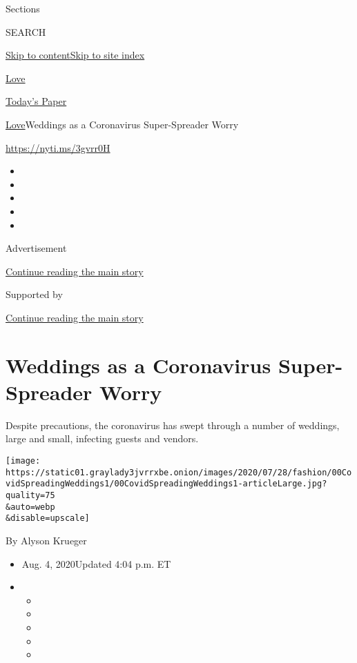 Sections

SEARCH

\protect\hyperlink{site-content}{Skip to
content}\protect\hyperlink{site-index}{Skip to site index}

\href{https://www.nytimes3xbfgragh.onion/section/fashion/weddings}{Love}

\href{https://myaccount.nytimes3xbfgragh.onion/auth/login?response_type=cookie\&client_id=vi}{}

\href{https://www.nytimes3xbfgragh.onion/section/todayspaper}{Today's
Paper}

\href{/section/fashion/weddings}{Love}\textbar{}Weddings as a
Coronavirus Super-Spreader Worry

\url{https://nyti.ms/3gvrr0H}

\begin{itemize}
\item
\item
\item
\item
\item
\end{itemize}

Advertisement

\protect\hyperlink{after-top}{Continue reading the main story}

Supported by

\protect\hyperlink{after-sponsor}{Continue reading the main story}

\hypertarget{weddings-as-a-coronavirus-super-spreader-worry}{%
\section{Weddings as a Coronavirus Super-Spreader
Worry}\label{weddings-as-a-coronavirus-super-spreader-worry}}

Despite precautions, the coronavirus has swept through a number of
weddings, large and small, infecting guests and vendors.

\texttt{[image: https://static01.graylady3jvrrxbe.onion/images/2020/07/28/fashion/00CovidSpreadingWeddings1/00CovidSpreadingWeddings1-articleLarge.jpg?quality=75\\\&auto=webp\\\&disable=upscale]}

By Alyson Krueger

\begin{itemize}
\item
  Aug. 4, 2020Updated 4:04 p.m. ET
\item
  \begin{itemize}
  \item
  \item
  \item
  \item
  \item
  \end{itemize}
\end{itemize}

